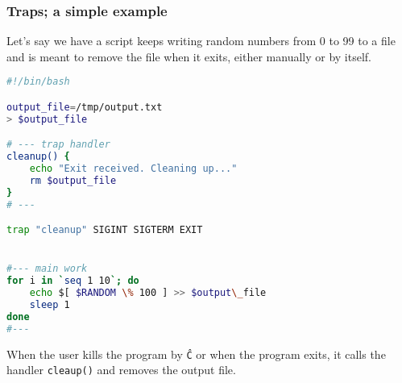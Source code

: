 \documentclass[a4paper]{article}
\begin{document}
\subsubsection{Traps; a simple example}

Let's say we have a script keeps writing random numbers from 0 to 99 to a file and is meant to remove the file when it exits, either manually or by itself.

\begin{lstlisting}[language=bash]
#!/bin/bash

output_file=/tmp/output.txt
> $output_file 

# --- trap handler
cleanup() {
	echo "Exit received. Cleaning up..."
	rm $output_file 
}
# ---

trap "cleanup" SIGINT SIGTERM EXIT


#--- main work 
for i in `seq 1 10`; do
	echo $[ $RANDOM \% 100 ] >> $output\_file 
	sleep 1
done
#---
\end{lstlisting}
When the user kills the program by \texttt{\^C} or when the program exits, it calls the handler \texttt{cleaup()} and removes the output file.


\newpage





\end{document}

